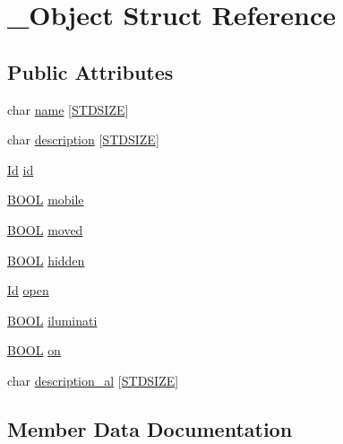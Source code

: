 \hypertarget{struct__Object}{}\section{\+\_\+\+Object Struct Reference}
\label{struct__Object}
\subsection*{Public Attributes}
\begin{DoxyCompactItemize}
\item 
char \hyperlink{struct__Object_a5f13167436f75d12f48d3f152ce91d0a}{name} \mbox{[}\hyperlink{types_8h_a431b1676533a0e1714aff7d6a5542406}{S\+T\+D\+S\+I\+ZE}\mbox{]}
\item 
char \hyperlink{struct__Object_a4797c28bbea5a64792ec85433ee7215e}{description} \mbox{[}\hyperlink{types_8h_a431b1676533a0e1714aff7d6a5542406}{S\+T\+D\+S\+I\+ZE}\mbox{]}
\item 
\hyperlink{types_8h_a845e604fb28f7e3d97549da3448149d3}{Id} \hyperlink{struct__Object_a3cff7a0e8dc4e9d23895ed9af1b7653a}{id}
\item 
\hyperlink{types_8h_a3e5b8192e7d9ffaf3542f1210aec18dd}{B\+O\+OL} \hyperlink{struct__Object_a95dd9ff00e5d341b5be3bc3a5bf1ee9a}{mobile}
\item 
\hyperlink{types_8h_a3e5b8192e7d9ffaf3542f1210aec18dd}{B\+O\+OL} \hyperlink{struct__Object_a584096c8e43f53884aa7216505cc0e89}{moved}
\item 
\hyperlink{types_8h_a3e5b8192e7d9ffaf3542f1210aec18dd}{B\+O\+OL} \hyperlink{struct__Object_a44824966fc9f4d5f82c189b2e063ddc4}{hidden}
\item 
\hyperlink{types_8h_a845e604fb28f7e3d97549da3448149d3}{Id} \hyperlink{struct__Object_a0922dd9891e6aa617ce1d51ae27c0175}{open}
\item 
\hyperlink{types_8h_a3e5b8192e7d9ffaf3542f1210aec18dd}{B\+O\+OL} \hyperlink{struct__Object_aac8af0a2662396bd255273a3cc8f22d7}{iluminati}
\item 
\hyperlink{types_8h_a3e5b8192e7d9ffaf3542f1210aec18dd}{B\+O\+OL} \hyperlink{struct__Object_a325dedec5324e588d2a86e7ffa478350}{on}
\item 
char \hyperlink{struct__Object_ac438e34e4ae95415af05464dd0db29b8}{description\+\_\+al} \mbox{[}\hyperlink{types_8h_a431b1676533a0e1714aff7d6a5542406}{S\+T\+D\+S\+I\+ZE}\mbox{]}
\end{DoxyCompactItemize}


\subsection{Member Data Documentation}
